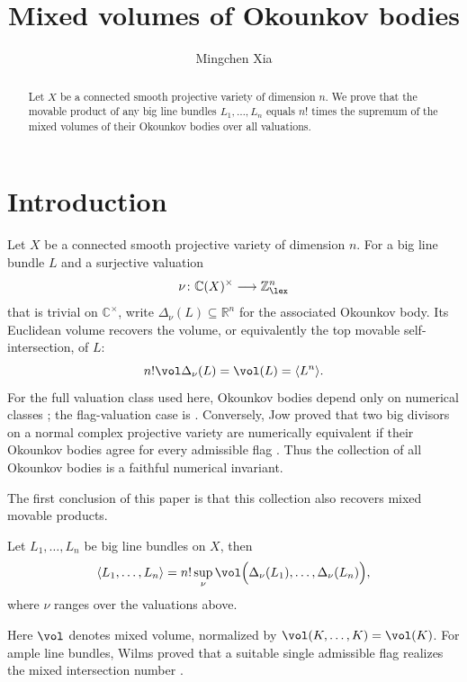 \documentclass[11pt,a4paper]{amsart}
\title{Mixed volumes of Okounkov bodies}
\author{Mingchen Xia}
\begin{document}
\begin{abstract}
Let $X$ be a connected smooth projective variety of dimension $n$.
We prove that the movable product of any big line bundles $L_1,\ldots,L_n$ equals $n!$ times the supremum of the mixed volumes of their Okounkov bodies over all valuations.
\end{abstract}
\maketitle

\section{Introduction}

Let $X$ be a connected smooth projective variety of dimension $n$.  For a
big line bundle $L$ and a surjective valuation
\[
 \nu\colon \mathbb C(X)^\times\longrightarrow\mathbb Z^n_{\lex}
\]
that is trivial on $\mathbb C^\times$, write
$\Delta_\nu(L)\subseteq\mathbb R^n$ for the associated Okounkov body.  Its
Euclidean volume recovers the volume, or equivalently the top movable
self-intersection, of $L$:
\begin{equation}\label{eq:diagonal-volume}
 n!\vol \Delta_\nu(L) =\vol(L)=\langle L^n\rangle.
\end{equation}
For the full valuation class used here, Okounkov bodies depend only on numerical classes \cite[Proposition~10.3.2]{Xiabook}; the flag-valuation case is \cite[Proposition~4.1]{LM09}.  Conversely, Jow proved that two big divisors
on a normal complex projective variety are numerically equivalent if their Okounkov bodies agree for every admissible flag
\cite[Theorem~A]{Jow10}.  Thus the collection of all Okounkov bodies is a faithful numerical invariant.

The first conclusion of this paper is that this collection also recovers mixed movable products. 
\begin{theorem}\label{thm:main1}
    Let $L_1,\ldots,L_n$ be big line bundles on $X$, then
    \begin{equation}\label{eq:movable-main}
        \langle L_1,\ldots,L_n\rangle =n!\sup_\nu\vol\Bigl(\Delta_\nu(L_1),\ldots,\Delta_\nu(L_n)\Bigr),
    \end{equation}
    where $\nu$ ranges over the valuations above.
\end{theorem}
Here $\vol$ denotes mixed volume, normalized by $\vol(K,\ldots,K)=\vol(K)$. For ample line bundles, Wilms proved that a suitable single admissible flag realizes the mixed intersection number \cite[Theorem~1.1]{Wil25}.
\end{document}
